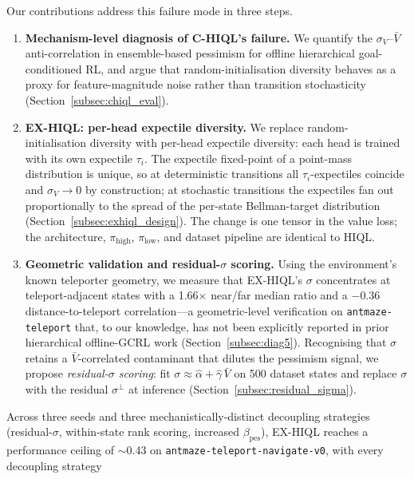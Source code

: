 \documentclass[11pt]{article}
\begin{document}
Our contributions address this failure mode in three steps.
\begin{enumerate}
  \item \textbf{Mechanism-level diagnosis of C-HIQL's failure.}
        We quantify the $\sigma_V$--$\bar V$ anti-correlation in
        ensemble-based pessimism for offline hierarchical
        goal-conditioned RL, and argue that random-initialisation
        diversity behaves as a proxy for feature-magnitude noise rather
        than transition stochasticity
        (Section~\ref{subsec:chiql_eval}).
  \item \textbf{EX-HIQL: per-head expectile diversity.}
        We replace random-initialisation diversity with per-head expectile
        diversity: each head is trained with its own expectile $\tau_i$.
        The expectile fixed-point of a point-mass distribution is unique,
        so at deterministic transitions all $\tau_i$-expectiles coincide
        and $\sigma_V \to 0$ by construction; at stochastic transitions the
        expectiles fan out proportionally to the spread of the per-state
        Bellman-target distribution (Section~\ref{subsec:exhiql_design}).
        The change is one tensor in the value loss; the architecture,
        $\pi_\text{high}$, $\pi_\text{low}$, and dataset pipeline are
        identical to HIQL.
  \item \textbf{Geometric validation and residual-$\sigma$ scoring.}
        Using the environment's known teleporter geometry, we measure
        that EX-HIQL's $\sigma$ concentrates at teleport-adjacent
        states with a 1.66$\times$ near/far median ratio and a $-0.36$
        distance-to-teleport correlation---a geometric-level
        verification on \texttt{antmaze-teleport} that, to our
        knowledge, has not been explicitly reported in prior
        hierarchical offline-GCRL work
        (Section~\ref{subsec:diag5}).
        Recognising that $\sigma$ retains a $\bar V$-correlated contaminant
        that dilutes the pessimism signal, we propose \emph{residual-$\sigma$
        scoring}: fit $\sigma \approx \hat\alpha + \hat\gamma\,\bar V$ on
        500 dataset states and replace $\sigma$ with the residual
        $\sigma^\perp$ at inference
        (Section~\ref{subsec:residual_sigma}).
\end{enumerate}
Across three seeds and three mechanistically-distinct decoupling strategies
(residual-$\sigma$, within-state rank scoring, increased
$\beta_\text{pes}$), EX-HIQL reaches a performance ceiling of $\sim$0.43 on
\texttt{antmaze-teleport-navigate-v0}, with every decoupling strategy
\end{document}
